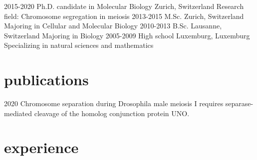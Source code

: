 \documentclass[]{twentysecondcv}
\begin{document}
\begin{twenty}
  \twentyitem
    {2015-2020}
    {Ph.D. {\normalfont candidate in Molecular Biology}}
    {Zurich, Switzerland}
    {Research field: Chromosome segregation in meiosis}
  \twentyitem
    {2013-2015}
    {M.Sc.}
    {Zurich, Switzerland}
    {Majoring in Cellular and Molecular Biology}
  \twentyitem
    {2010-2013}
    {B.Sc.}
    {Lausanne, Switzerland}
    {Majoring in Biology}
  \twentyitem
    {2005-2009}
    {High school}
    {Luxemburg, Luxemburg}
    {Specializing in natural sciences and mathematics}
\end{twenty}


\section{publications}

\begin{twentyshort}
  \twentyitemshort
    {2020}
    {Chromosome separation during Drosophila male meiosis I requires separase-mediated cleavage of the homolog conjunction protein UNO.}
\end{twentyshort}

\section{experience}
\end{document}
